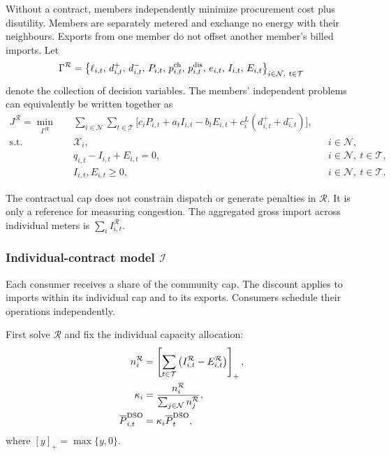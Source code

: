 Without a contract, members independently minimize
procurement cost plus disutility. Members are separately metered
and exchange no energy with their neighbours. Exports from one
member do not offset another member's billed imports.
Let
\[
\Gamma^{\mathcal R}
=
\left\{
\ell_{i,t},\,d^+_{i,t},\,d^-_{i,t},\,P_{i,t},\,
p^{\rm ch}_{i,t},\,p^{\rm dis}_{i,t},\,e_{i,t},\,
I_{i,t},\,E_{i,t}
\right\}_{i\in\mathcal N,\ t\in\mathcal T}
\]
denote the collection of decision variables.
The members' independent problems can equivalently be written together as
\begin{subequations}
\label{eq:q1-model-R}
\begin{align}
J^{\mathcal R}
=\min\limits_{\Gamma^{\mathcal R}}\quad&
\sum_{i\in\mathcal N}\sum_{t\in\mathcal T}
\Big[
c_iP_{i,t}
+a_tI_{i,t}-b_tE_{i,t}
+c_i^L(d^+_{i,t}+d^-_{i,t})
\Big],
\label{eq:q1-R-objective}\\
\mathrm{s.t.}\quad&
\mathcal X_i,
&&i\in\mathcal N,\\
&q_{i,t}-I_{i,t}+E_{i,t}=0,
&&i\in\mathcal N,\ t\in\mathcal T,
\label{eq:q1-R-balance}\\
&I_{i,t},E_{i,t}\ge0,
&&i\in\mathcal N,\ t\in\mathcal T.
\end{align}
\end{subequations}

The contractual cap does not constrain dispatch
or generate penalties in $\mathcal R$.
It is only a reference for measuring congestion.
The aggregated gross import across individual
meters is $\sum_i I_{i,t}^{\mathcal R}$.


\subsubsection{Individual-contract model $\mathcal I$}

Each consumer receives a share of the community cap. The discount
applies to imports within its individual cap and to its exports.
Consumers schedule their operations independently.

First solve $\mathcal R$ and fix the individual
capacity allocation:
\begin{align}
n_i^{\mathcal R}
&=
\left[
\sum_{t\in\mathcal T}
\left(
I_{i,t}^{\mathcal R}-E_{i,t}^{\mathcal R}
\right)
\right]_+,
\label{eq:q1-reference-net-import}\\
\kappa_i
&=\frac{n_i^{\mathcal R}}
        {\sum_{j\in\mathcal N}n_j^{\mathcal R}},
\label{eq:q1-cap-share}\\
\overline P_{i,t}^{\rm DSO}
&=\kappa_i\overline P_t^{\rm DSO},
\label{eq:q1-individual-cap}
\end{align}
where $[y]_+=\max\{y,0\}$.

